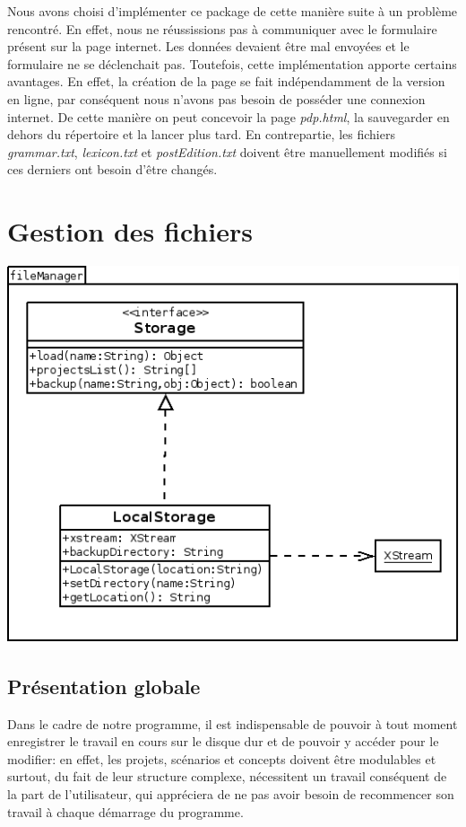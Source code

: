 \documentclass[12pt]{report}
\begin{document}
\bigskip
Nous avons choisi d'implémenter ce package de cette manière suite à un problème rencontré. En effet, nous ne réussissions pas à communiquer avec le formulaire présent sur la page internet. Les données devaient être mal envoyées et le formulaire ne se déclenchait pas. Toutefois, cette implémentation apporte certains avantages. En effet, la création de la page se fait indépendamment de la version en ligne, par conséquent nous n'avons pas besoin de posséder une connexion internet. De cette manière on peut concevoir la page \emph{pdp.html}, la sauvegarder en dehors du répertoire et la lancer plus tard. En contrepartie, les fichiers \emph{grammar.txt}, \emph{lexicon.txt} et \emph{postEdition.txt} doivent être manuellement modifiés si ces derniers ont besoin d'être changés.

\section{Gestion des fichiers}


\begin{center}
\includegraphics[scale=0.55]{diversuml/fileManager.png}
\end{center}


\subsection{Présentation globale}

	Dans le cadre de notre programme, il est indispensable de pouvoir à tout moment enregistrer le travail en cours sur
le disque dur et de pouvoir y accéder pour le modifier: en effet, les projets, scénarios et concepts doivent être modulables
et surtout, du fait de leur structure complexe, nécessitent un travail conséquent de la part de l'utilisateur, qui appréciera
de ne pas avoir besoin de recommencer son travail à chaque démarrage du programme.
\end{document}
